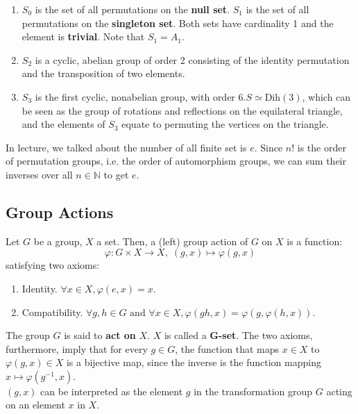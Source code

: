   \begin{example}
    \begin{enumerate}
      \item $S_{0}$ is the set of all permutations on the \textbf{null set}. $S_{1}$ is the set of all permutations on the \textbf{singleton set}. Both sets have cardinality 1 and the element is \textbf{trivial}. Note that $S_{1} = A_{1}$. 
      \item $S_{2}$ is a cyclic, abelian group of order 2 consisting of the identity permutation and the transposition of two elements. 
      \item $S_{3}$ is the first cyclic, nonabelian group, with order 6.$S \simeq \text{Dih}(3)$, which can be seen as the group of rotations and reflections on the equilateral triangle, and the elements of $S_{3}$ equate to permuting the vertices on the triangle. 
    \end{enumerate}
  \end{example}

  In lecture, we talked about the number of all finite set is $e$. Since $n!$ is the order of permutation groups, i.e. the order of automorphism groups, we can sum their inverses over all $n \in \mathbb{N}$ to get $e$. 

\subsection{Group Actions} 

  \begin{definition}
    Let $G$ be a group, $X$ a set. Then, a (left) group action of $G$ on $X$ is a function: 
    \begin{equation}
      \varphi: G \times X \longrightarrow X, \; (g,x) \longmapsto \varphi(g,x)
    \end{equation}
    satisfying two axioms:
    \begin{enumerate}
      \item Identity. $\forall x \in X, \varphi(e, x) = x$. 
      \item Compatibility. $\forall g, h \in G \text{ and } \forall x \in X, \varphi(gh, x) = \varphi(g, \varphi(h, x))$.
    \end{enumerate}
    The group $G$ is said to \textbf{act on} $X$. $X$ is called a \textbf{G-set}. The two axioms, furthermore, imply that for every $g \in G$, the function that maps $x \in X$ to $ \varphi(g, x) \in X$ is a bijective map, since the inverse is the function mapping $x \mapsto \varphi(g^{-1}, x)$. \\
    $(g, x)$ can be interpreted as the element $g$ in the transformation group $G$ acting on an element $x$ in $X$.
  \end{definition}

